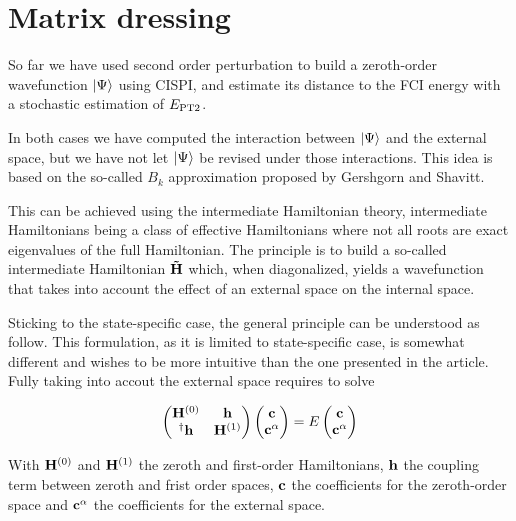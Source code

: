 \documentclass[./thesis.tex]{subfiles}
\begin{document}
\section{Matrix dressing}

So far we have used second order perturbation to build a zeroth-order wavefunction $\ket \Psi$ using CISPI, and estimate its distance to the FCI energy with a stochastic estimation of $E_\text{PT2}$.

In both cases we have computed the interaction between $\ket \Psi$ and the external space, but we have not let $\ket \Psi$ be revised under those interactions. This idea is based on the so-called $B_k$ approximation proposed by Gershgorn and Shavitt\cite{Gershgorn_1968}.

This can be achieved using the intermediate Hamiltonian theory\cite{0305-4470-18-5-014}, intermediate Hamiltonians being a class of effective Hamiltonians\cite{lindgren1982atomic} where not all roots are exact eigenvalues of the full Hamiltonian.
The principle is to build a so-called intermediate Hamiltonian ${\bf \tilde H}$ which, when diagonalized, yields a wavefunction that takes into account the effect of an external space on the internal space. 


Sticking to the state-specific case, the general principle can be understood as follow. This formulation, as it is limited to state-specific case, is somewhat different and wishes to be more intuitive than the one presented in the article.
Fully taking into accout the external space requires to solve 

\newcommand{\Hzero}{{\bf H}^{(0)}}
\newcommand{\hcpl}{{\bf h}}

\begin{equation}
\begin{pmatrix}
\Hzero &  \hcpl\\ 
^\dagger\hcpl & {\bf H}^{(1)}
\end{pmatrix} \begin{pmatrix}
{\bf c}\\ 
{\bf c}^\alpha
\end{pmatrix}=E\begin{pmatrix}
{\bf c}\\ 
{\bf c}^\alpha
\end{pmatrix}
\end{equation}

With ${\bf H}^{(0)}$ and ${\bf H}^{(1)}$ the zeroth and first-order Hamiltonians, $\bf h$ the coupling term between zeroth and frist order spaces, ${\bf c}$ the coefficients for the zeroth-order space and ${\bf c}^\alpha$ the coefficients for the external space.
\end{document}
